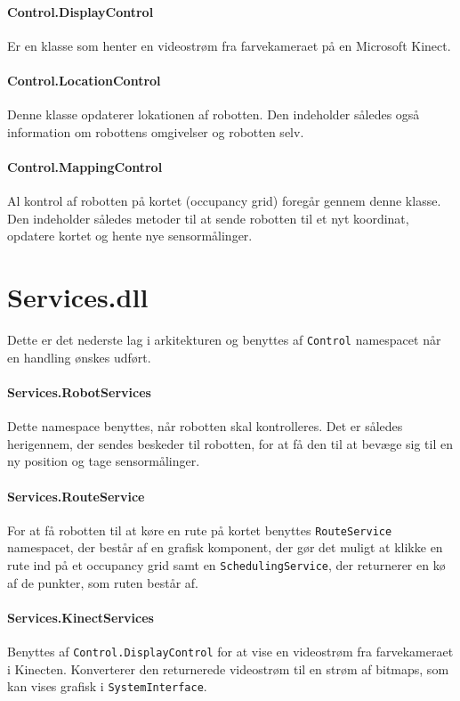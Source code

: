 \paragraph{Control.DisplayControl}
Er en klasse som henter en videostrøm fra farvekameraet på en Microsoft Kinect.

\paragraph{Control.LocationControl}
Denne klasse opdaterer lokationen af robotten.
Den indeholder således også information om robottens omgivelser og robotten selv.

\paragraph{Control.MappingControl}
Al kontrol af robotten på kortet (occupancy grid) foregår gennem denne klasse.
Den indeholder således metoder til at sende robotten til et nyt koordinat, opdatere kortet og hente nye sensormålinger.

\section{Services.dll}\label{arkitektur:services}
Dette er det nederste lag i arkitekturen og benyttes af \lstinline[style=csharp]!Control! namespacet når en handling ønskes udført.

\paragraph{Services.RobotServices}
Dette namespace benyttes, når robotten skal kontrolleres.
Det er således herigennem, der sendes beskeder til robotten, for at få den til at bevæge sig til en ny position og tage sensormålinger.

\paragraph{Services.RouteService}
For at få robotten til at køre en rute på kortet benyttes \lstinline[style=csharp]!RouteService! namespacet, der består af en grafisk komponent, der gør det muligt at klikke en rute ind på et occupancy grid samt en \lstinline[style=csharp]|SchedulingService|, der returnerer en kø af de punkter, som ruten består af.

\paragraph{Services.KinectServices}
Benyttes af \lstinline[style=csharp]!Control.DisplayControl! for at vise en videostrøm fra farvekameraet i Kinecten.
Konverterer den returnerede videostrøm til en strøm af bitmaps, som kan vises grafisk i \lstinline[style=csharp]!SystemInterface!.

